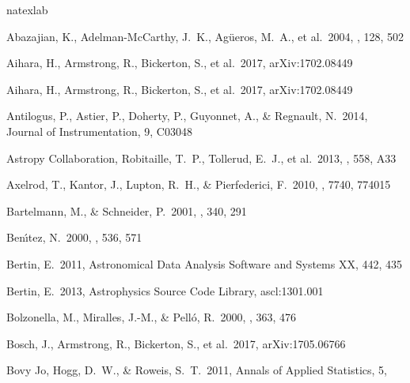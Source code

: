 \documentclass[useamsfonts]{pasj01}
\begin{document}
\begin{thebibliography}{}
    \label{sec:ref}
    \expandafter\ifx\csname natexlab\endcsname\relax\def\natexlab#1{#1}\fi

     Abazajian, K., Adelman-McCarthy,
             J.~K., Ag{\"u}eros, M.~A., et al.\ 2004, \aj, 128, 502

     Aihara, H., Armstrong, R., Bickerton, S.,
             et al.\ 2017, arXiv:1702.08449
             
     Aihara, H., Armstrong, R., 
             Bickerton, S., et al.\ 2017, arXiv:1702.08449 

     Antilogus, P., Astier, P.,
             Doherty, P., Guyonnet, A., \& Regnault, N.\ 2014, Journal of
             Instrumentation, 9, C03048

     Astropy Collaboration,
             Robitaille, T.~P., Tollerud, E.~J., et al.\ 2013, \aap, 558, A33

     Axelrod, T., Kantor, J., Lupton,
             R.~H., \& Pierfederici, F.\ 2010, \procspie, 7740, 774015

     Bartelmann, M., \&
             Schneider, P.\ 2001, \physrep, 340, 291

     Ben{\'{\i}}tez, N.\ 2000, \apj,
             536, 571

     Bertin, E.\ 2011, Astronomical Data Analysis
             Software and Systems XX, 442, 435

     Bertin, E.\ 2013, Astrophysics Source
             Code Library, ascl:1301.001

     Bolzonella, M., Miralles, J.-M.,
            \& Pell{\'o}, R.\ 2000, \aap, 363, 476
    
     Bosch, J., Armstrong, R., Bickerton, S., 
            et al.\ 2017, arXiv:1705.06766 
    
     Bovy Jo, Hogg, D.~W., \& Roweis,
             S.~T.\ 2011, Annals of Applied Statistics, 5,


\end{thebibliography}
\end{document}
